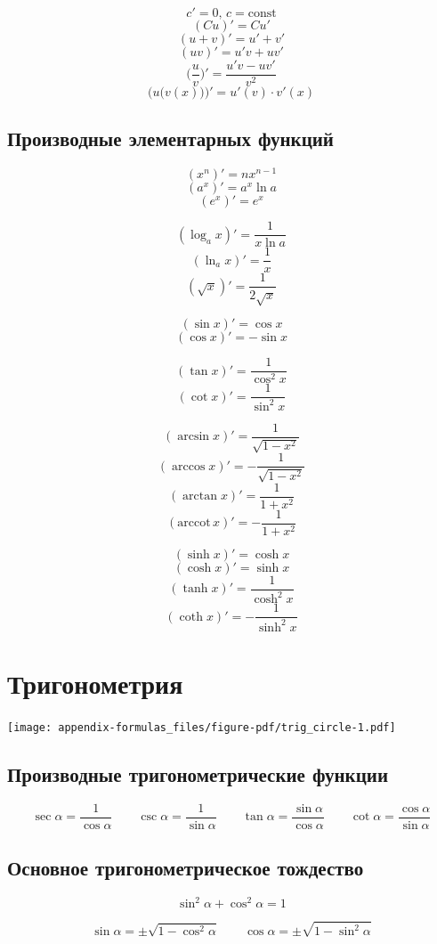 \documentclass[
  letterpaper,
]{scrbook}
\newcommand{\const}{\text{const}}
\theoremstyle{definition}
\theoremstyle{remark}
\begin{document}
\[c' = 0, \, c = \const\] \[(Cu)' = Cu'\] \[(u + v)' = u' + v'\]
\[(uv)' = u'v + uv'\]
\[\Big( \frac{u}{v} \Big)' = \frac{u'v - uv'}{v^2}\]
\[\Big(u\big(v(x)\big)\Big)' = u'(v) \cdot v'(x)\]

\subsection{Производные элементарных
функций}\label{formulas_deriv_funcs}

\[(x^n)' = nx^{n-1}\] \[(a^x)' = a^x \ln a\] \[(e^x)' = e^x\]

\[(\log_a x)' = \frac{1}{x \ln a}\] \[(\ln_a x)' = \frac{1}{x}\]
\[(\sqrt{x})' = \frac{1}{2\sqrt{x}}\]

\[(\sin x)' = \cos x\] \[(\cos x)' = -\sin x\]

\[(\tan x)' = \frac{1}{\cos^2 x}\] \[(\cot x)' = \frac{1}{\sin^2 x}\]

\[(\arcsin x)' = \frac{1}{\sqrt{1 - x^2}}\]
\[(\arccos x)' = -\frac{1}{\sqrt{1 - x^2}}\]
\[(\arctan x)' = \frac{1}{1 + x^2}\]
\[(\text{arccot}\, x)' = -\frac{1}{1 + x^2}\]

\[(\sinh x)' = \cosh x\] \[(\cosh x)' = \sinh x\]
\[(\tanh x)' = \frac{1}{\cosh^2 x}\]
\[(\coth x)' = -\frac{1}{\sinh^2 x}\]

\section{Тригонометрия}\label{formulas_trig}

\texttt{[image: appendix-formulas\_files/figure-pdf/trig\_circle-1.pdf]}

\subsection{Производные тригонометрические функции}\label{trig_funs_def}

\[
\sec \alpha = \frac{1}{\cos \alpha} \qquad
\csc \alpha = \frac{1}{\sin \alpha} \qquad
\tan \alpha = \frac{\sin \alpha}{\cos \alpha} \qquad
\cot \alpha = \frac{\cos \alpha}{\sin \alpha}
\]

\subsection{Основное тригонометрическое
тождество}\label{trig_pythagorean_identities}

\[
\sin^2 \alpha + \cos^2 \alpha = 1
\]

\[
\sin \alpha = \pm \sqrt{1 - \cos^2 \alpha} \qquad \cos \alpha = \pm \sqrt{1 - \sin^2 \alpha}
\]
\end{document}
